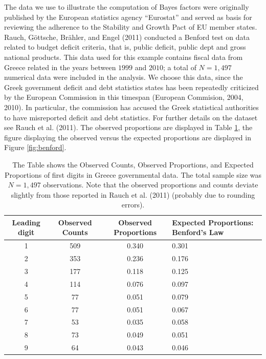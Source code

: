 \documentclass[
  english,
  man,floatsintext]{apa6}
\begin{document}
The data we use to illustrate the computation of Bayes factors were originally published by the European statistics agency ``Eurostat'' and served as basis for reviewing the adherence to the Stability and Growth Pact of EU member states. Rauch, Göttsche, Brähler, and Engel (2011) conducted a Benford test on data related to budget deficit criteria, that is, public deficit, public dept and gross national products. This data used for this example contains fiscal data from Greece related in the years between \(1999\) and \(2010\); a total of \(N= 1{,}497\) numerical data were included in the analysis. We choose this data, since the Greek government deficit and debt statistics states has been repeatedly criticized by the European Commission in this timespan (European Commision, 2004, 2010). In particular, the commission has accused the Greek statistical authorities to have misreported deficit and debt statistics. For further details on the dataset see Rauch et al. (2011). The observed proportions are displayed in Table \ref{Tab:benford}, the figure displaying the observed versus the expected proportions are displayed in Figure \ref{fig:benford}.

\begin{table}[h]
    \centering
    \caption{The Table shows the Observed Counts, Observed Proportions, and Expected Proportions of first digits in Greece governmental data. The total sample size was $N = 1{,}497$ observations. Note that the observed proportions and counts deviate slightly from those reported in Rauch et al. (2011) (probably due to rounding errors).}
    \begin{tabular}{cccp{4cm}}
        \hline
Leading digit & Observed Counts & Observed Proportions & Expected Proportions: Benford's Law  \\
        \hline
        1 & 509 & 0.340 & 0.301  \\
        2 & 353 & 0.236 & 0.176  \\
        3 & 177 & 0.118 & 0.125  \\
        4 & 114 & 0.076 & 0.097  \\
        5 & 77 & 0.051 & 0.079  \\
        6 & 77 & 0.051 & 0.067  \\
        7 & 53 & 0.035 & 0.058  \\
        8 & 73 & 0.049 & 0.051  \\
        9 & 64 & 0.043 & 0.046  \\
        \hline
    \end{tabular}
    \label{Tab:benford}
\end{table}
\end{document}
